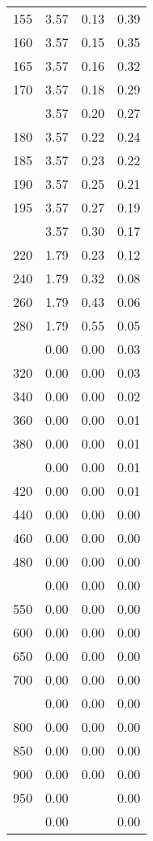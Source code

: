 \begin{table}[ht]
\begin{tabular}{lccc}
  155 & 3.57 & 0.13 & 0.39 \\ 
  160 & 3.57 & 0.15 & 0.35 \\ 
  165 & 3.57 & 0.16 & 0.32 \\ 
  170 & 3.57 & 0.18 & 0.29 \\ 
   \addlinespace
175 & 3.57 & 0.20 & 0.27 \\ 
  180 & 3.57 & 0.22 & 0.24 \\ 
  185 & 3.57 & 0.23 & 0.22 \\ 
  190 & 3.57 & 0.25 & 0.21 \\ 
  195 & 3.57 & 0.27 & 0.19 \\ 
   \addlinespace
200 & 3.57 & 0.30 & 0.17 \\ 
  220 & 1.79 & 0.23 & 0.12 \\ 
  240 & 1.79 & 0.32 & 0.08 \\ 
  260 & 1.79 & 0.43 & 0.06 \\ 
  280 & 1.79 & 0.55 & 0.05 \\ 
   \addlinespace
300 & 0.00 & 0.00 & 0.03 \\ 
  320 & 0.00 & 0.00 & 0.03 \\ 
  340 & 0.00 & 0.00 & 0.02 \\ 
  360 & 0.00 & 0.00 & 0.01 \\ 
  380 & 0.00 & 0.00 & 0.01 \\ 
   \addlinespace
400 & 0.00 & 0.00 & 0.01 \\ 
  420 & 0.00 & 0.00 & 0.01 \\ 
  440 & 0.00 & 0.00 & 0.00 \\ 
  460 & 0.00 & 0.00 & 0.00 \\ 
  480 & 0.00 & 0.00 & 0.00 \\ 
   \addlinespace
500 & 0.00 & 0.00 & 0.00 \\ 
  550 & 0.00 & 0.00 & 0.00 \\ 
  600 & 0.00 & 0.00 & 0.00 \\ 
  650 & 0.00 & 0.00 & 0.00 \\ 
  700 & 0.00 & 0.00 & 0.00 \\ 
   \addlinespace
750 & 0.00 & 0.00 & 0.00 \\ 
  800 & 0.00 & 0.00 & 0.00 \\ 
  850 & 0.00 & 0.00 & 0.00 \\ 
  900 & 0.00 & 0.00 & 0.00 \\ 
  950 & 0.00 &  & 0.00 \\ 
   \addlinespace
1000 & 0.00 &  & 0.00 \\ 
   \bottomrule
\end{tabular}
\end{table}
